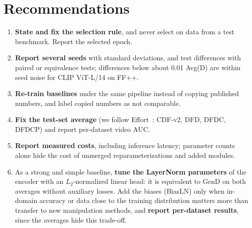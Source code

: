 \documentclass[fonts]{icst}
\begin{document}
\section{Recommendations}
\label{sec:recommend}
\begin{enumerate}[leftmargin=*, topsep=2pt, itemsep=2pt]
    \item \textbf{State and fix the selection rule}, and never select on data from a test benchmark. Report the selected epoch.
    \item \textbf{Report several seeds} with standard deviations, and test differences with paired or equivalence tests; differences below about 0.01 Avg(D) are within seed noise for CLIP ViT-L/14 on FF++.
    \item \textbf{Re-train baselines} under the same pipeline instead of copying published numbers, and label copied numbers as not comparable.
    \item \textbf{Fix the test-set average} (we follow Effort~\cite{yan2025effort}: CDF-v2, DFD, DFDC, DFDCP) and report per-dataset video AUC.
    \item \textbf{Report measured costs}, including inference latency; parameter counts alone hide the cost of unmerged reparameterizations and added modules.
    \item As a strong and simple baseline, \textbf{tune the LayerNorm parameters} of the encoder with an $L_2$-normalized linear head: it is equivalent to GenD on both averages without auxiliary losses. Add the biases (BiasLN) only when in-domain accuracy or data close to the training distribution matters more than transfer to new manipulation methods, and \textbf{report per-dataset results}, since the averages hide this trade-off.
\end{enumerate}

\end{document}
